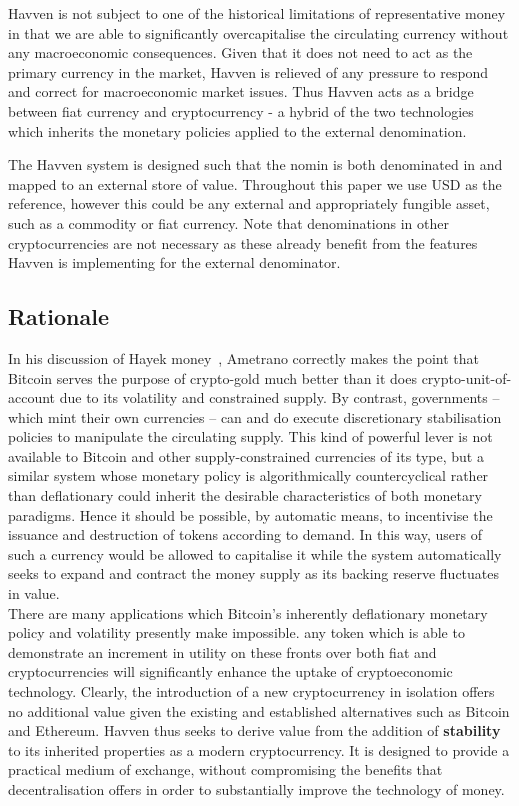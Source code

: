 \noindent Havven is not subject to one of the historical limitations of representative money in that we are able to significantly overcapitalise the circulating currency without any macroeconomic consequences. Given that it does not need to act as the primary currency in the market, Havven is relieved of any pressure to respond and correct for macroeconomic market issues. Thus Havven acts as a bridge between fiat currency and
cryptocurrency - a hybrid of the two technologies which inherits the monetary policies applied to the external denomination.

\noindent The Havven system is designed such that the nomin is both denominated in and
mapped to an external store of value. Throughout this paper we use USD as the reference, however this could
be any external and appropriately fungible asset, such as a commodity or fiat currency. Note that denominations
in other cryptocurrencies are not necessary as these already benefit from the features Havven is implementing
for the external denominator.

\subsection{Rationale}

\noindent  In his discussion of Hayek money~\cite{ametrano2016hayek}, Ametrano correctly makes the point that
Bitcoin serves the purpose of crypto-gold much better than it does crypto-unit-of-account due to its volatility
and constrained supply. By contrast, governments -- which mint their own currencies -- can and do execute
discretionary stabilisation policies to manipulate the circulating supply. This kind of powerful lever is not
available to Bitcoin and other supply-constrained currencies of its type, but a similar system whose monetary
policy is algorithmically countercyclical rather than deflationary could inherit the desirable characteristics
of both monetary paradigms. Hence it should be possible, by automatic means, to incentivise the issuance and
destruction of tokens according to demand. In this way, users of such a currency would be allowed to
capitalise it while the system automatically seeks to expand and contract the money supply as its backing
reserve fluctuates in value. \\

\noindent There are many applications which Bitcoin's inherently deflationary monetary policy and
volatility presently make impossible. any token which is able to demonstrate an increment
in utility on these fronts over both fiat and cryptocurrencies will significantly
enhance the uptake of cryptoeconomic technology. Clearly, the introduction of a new cryptocurrency in isolation offers no additional value given
the existing and established alternatives such as Bitcoin and Ethereum. Havven thus seeks to derive value
from the addition of \textbf{stability} to its inherited properties as a modern cryptocurrency.
It is designed to provide a practical medium of exchange, without compromising the benefits that decentralisation offers in order to substantially improve the technology of money.

\pagebreak
